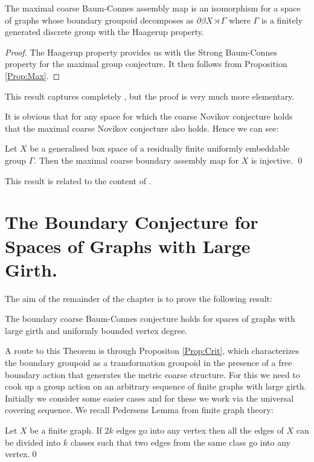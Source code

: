 \begin{theorem}
The maximal coarse Baum-Connes assembly map is an isomorphism for a space of graphs whose boundary groupoid decomposes as $\partial\beta X \rtimes \Gamma$ where $\Gamma$ is a finitely generated discrete group with the Haagerup property.
\end{theorem}
\begin{proof}
The Haagerup property provides us with the Strong Baum-Connes property for the maximal group conjecture. It then follows from Proposition \ref{Prop:Max}.
\end{proof}

This result captures completely \cite[Corollary 4.18]{MR2568691}, but the proof is very much more elementary.

It is obvious that for any space for which the coarse Novikov conjecture holds that the maximal coarse Novikov conjecture also holds. Hence we can see:

\begin{theorem}
Let $X$ be a generalised box space of a residually finite uniformly embeddable group $\Gamma$. Then the maximal coarse boundary assembly map for $X$ is injective. \qed
\end{theorem}

This result is related to the content of \cite[Theorem 5.1]{MR2431253} .

\section{The Boundary Conjecture for Spaces of Graphs with Large Girth.}\label{Sect:MR}
The aim of the remainder of the chapter is to prove the following result:
\begin{theorem}
The boundary coarse Baum-Connes conjecture holds for spaces of graphs with large girth and uniformly bounded vertex degree.
\end{theorem}

A route to this Theorem is through Propositon \ref{Prop:Crit}, which characterizes the boundary groupoid as a transformation groupoid in the presence of a free boundary action that generates the metric coarse structure. For this we need to cook up a group action on an arbitrary sequence of finite graphs with large girth. Initially we consider some easier cases and for these we work via the universal covering sequence. We recall Pedersens Lemma \cite[Theorem 7, Chapter XI]{MR1035708} from finite graph theory:

\begin{lemma}\label{Lem:PL}
Let $X$ be a finite graph. If $2k$ edges go into any vertex then all the edges of $X$ can be divided into $k$ classes such that two edges from the same class go into any vertex.\qed
\end{lemma}

